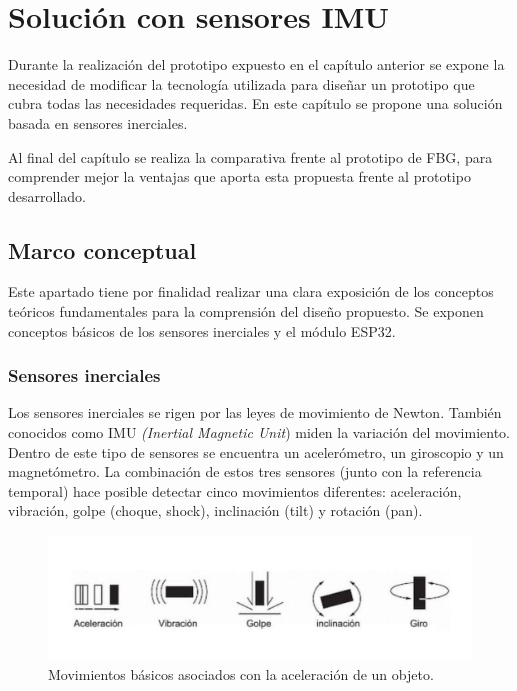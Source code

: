 \chapter{Solución con sensores IMU\label{sec:IMU}}

\label{sec:IMU4}

Durante la realización del prototipo expuesto en el capítulo anterior se expone la necesidad de modificar la tecnología utilizada para diseñar un prototipo que cubra todas las necesidades requeridas. En este capítulo se propone una solución basada en sensores inerciales. 


Al final del capítulo se realiza la comparativa frente al prototipo de FBG, para comprender mejor la ventajas que aporta esta propuesta frente al prototipo desarrollado. 

\section{Marco conceptual}
\label{sec:marco4}

Este apartado tiene por finalidad realizar una clara exposición de los conceptos teóricos fundamentales para la comprensión del diseño propuesto. Se exponen conceptos básicos de los sensores inerciales y el módulo ESP32.  


\subsection{Sensores inerciales}
\label{sec:asdf4}

Los sensores inerciales se rigen por las leyes de movimiento de Newton. También conocidos como IMU \textit{(Inertial Magnetic Unit}) miden la variación del movimiento. Dentro de este tipo de sensores se encuentra un acelerómetro, un giroscopio y un magnetómetro. La combinación de estos tres sensores (junto con la referencia temporal) hace posible detectar cinco movimientos diferentes: aceleración, vibración, golpe (choque, shock), inclinación (tilt) y rotación (pan).

\begin{figure}[H]
	\centering
	\includegraphics[width=1\textwidth]{./img/movimientoAcelera2}
	\caption{Movimientos básicos asociados con la aceleración de un objeto. \cite{juanDiego}} 
	\label{fig:movimientosAcelera}
\end{figure} 


